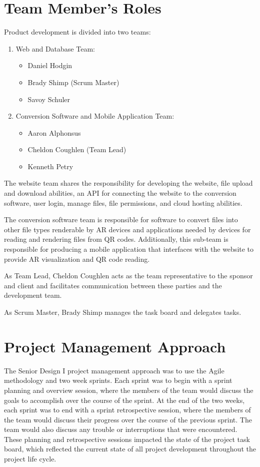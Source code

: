 
\section{Team Member's Roles}

Product development is divided into two teams:
\begin{enumerate}
    \item Web and Database Team:
        \begin{itemize}
            \item Daniel Hodgin
            \item Brady Shimp (Scrum Master)
            \item Savoy Schuler
        \end{itemize}
    \item Conversion Software and Mobile Application Team:
        \begin{itemize}
            \item Aaron Alphonsus
            \item Cheldon Coughlen (Team Lead)
            \item Kenneth Petry
        \end{itemize}
\end{enumerate}

The website team shares the responsibility for developing the website, file upload and download abilities, an API for connecting the website to the conversion software, user login,  manage files, file permissions, and cloud hosting abilities.  

The conversion software team is responsible for software to convert files into other file types renderable by AR devices and applications needed by devices for reading and rendering files from QR codes.  Additionally,  this sub-team is responsible for producing a mobile application that interfaces with the website to provide AR visualization and QR code reading.


As Team Lead, Cheldon Coughlen acts as the team representative to the sponsor and client and facilitates communication between these parties and the development team. 

As Scrum Master, Brady Shimp manages the task board and delegates tasks. 

\section{Project Management Approach}

The Senior Design I project management approach was to use the Agile methodology and two week sprints.  Each sprint was to begin with a sprint planning and overview session, where the members of the team would discuss the goals to accomplish over the course of the sprint.  At the end of the two weeks, each sprint was to end with a sprint retrospective session, where the members of the team would discuss their progress over the course of the previous sprint.  The team would also discuss any trouble or interruptions that were encountered. These planning and retrospective sessions impacted the state of the project task board, which reflected the current state of all project development throughout the project life cycle.

